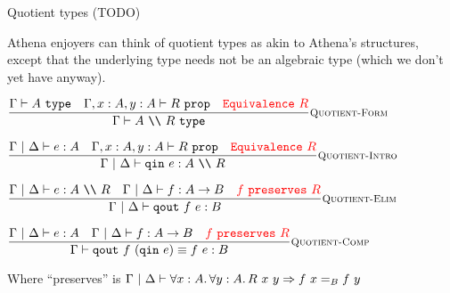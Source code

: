 \documentclass{beamer}
\begin{document}
\newcommand{\quotient}[2]{#1\ \texttt{\textbackslash\textbackslash}\ #2}
\newcommand{\quotientintro}[1]{\texttt{qin}\ #1}
\newcommand{\quotientelim}[2]{\texttt{qout}\ #1\ #2}

\begin{frame}{Quotient types (TODO)}

Athena enjoyers can think of quotient types as akin to Athena's structures, except that the underlying type needs not be an algebraic type (which we don't yet have anyway).

\begin{center}
  $\infrule[Quotient-Form]{\type{A} \quad \prop[\extend{\extend{\Gamma}{x}{A}}{y}{A}]{R} \quad \mathcolor{red}{\texttt{Equivalence}\ R}}{\type{\quotient{A}{R}}}$

  \vspace{1em}

  $\infrule[Quotient-Intro]{\typing[\Gamma \pipe \Delta]{e}{A} \quad \prop[\extend{\extend{\Gamma}{x}{A}}{y}{A}]{R} \quad \mathcolor{red}{\texttt{Equivalence}\ R}}{\typing[\Gamma \pipe \Delta]{\quotientintro{e}}{\quotient{A}{R}}}$

  \vspace{1em}

  $\infrule[Quotient-Elim]{\typing[\Gamma \pipe \Delta]{e}{\quotient{A}{R}} \quad \typing[\Gamma \pipe \Delta]{f}{\Fun{A}{B}} \quad \mathcolor{red}{f\ \texttt{preserves}\ R}}{\typing[\Gamma \pipe \Delta]{\quotientelim{f}{e}}{B}}$

  \vspace{1em}

  $\infrule[Quotient-Comp]{\typing[\Gamma \pipe \Delta]{e}{A} \quad \typing[\Gamma \pipe \Delta]{f}{\Fun{A}{B}} \quad \mathcolor{red}{f\ \texttt{preserves}\ R}}{\compeq{\quotientelim{f}{(\quotientintro{e})}}{\app{f}{e}}{B}}$
\end{center}

Where ``preserves'' is $\holds{\All{x}[A]{\All{y}[A]{\Impl{\app{\app{R}{x}}{y}}{\Eq[B]{\app{f}{x}}{\app{f}{y}}}}}}$
\end{frame}
\end{document}
